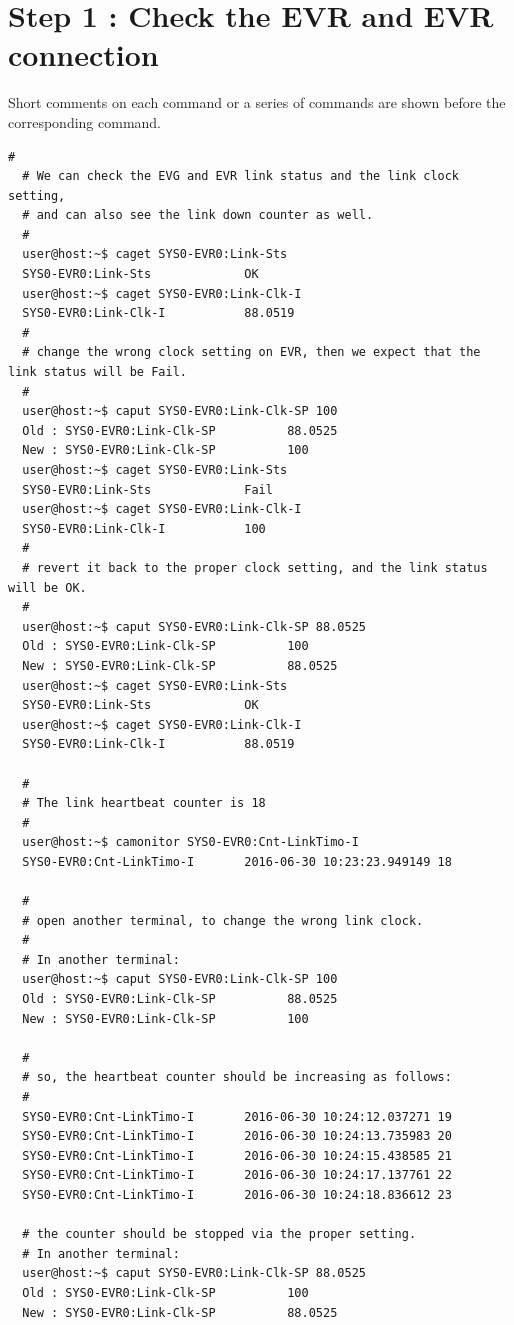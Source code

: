 \documentclass[11pt
  , a4paper
  , article
  , oneside
  , showtrims
]{memoir}
\begin{document}
\section{Step 1 : Check the EVR and EVR connection}
Short comments on each command or a series of commands are shown before the corresponding command.
\begin{lstlisting}[style=termstyle]
  #
  # We can check the EVG and EVR link status and the link clock setting,
  # and can also see the link down counter as well.
  #
  user@host:~$ caget SYS0-EVR0:Link-Sts
  SYS0-EVR0:Link-Sts             OK
  user@host:~$ caget SYS0-EVR0:Link-Clk-I
  SYS0-EVR0:Link-Clk-I           88.0519
  #
  # change the wrong clock setting on EVR, then we expect that the link status will be Fail.  
  #
  user@host:~$ caput SYS0-EVR0:Link-Clk-SP 100
  Old : SYS0-EVR0:Link-Clk-SP          88.0525
  New : SYS0-EVR0:Link-Clk-SP          100
  user@host:~$ caget SYS0-EVR0:Link-Sts
  SYS0-EVR0:Link-Sts             Fail
  user@host:~$ caget SYS0-EVR0:Link-Clk-I
  SYS0-EVR0:Link-Clk-I           100
  #
  # revert it back to the proper clock setting, and the link status will be OK.
  #
  user@host:~$ caput SYS0-EVR0:Link-Clk-SP 88.0525
  Old : SYS0-EVR0:Link-Clk-SP          100
  New : SYS0-EVR0:Link-Clk-SP          88.0525
  user@host:~$ caget SYS0-EVR0:Link-Sts
  SYS0-EVR0:Link-Sts             OK
  user@host:~$ caget SYS0-EVR0:Link-Clk-I
  SYS0-EVR0:Link-Clk-I           88.0519

  #
  # The link heartbeat counter is 18
  #
  user@host:~$ camonitor SYS0-EVR0:Cnt-LinkTimo-I
  SYS0-EVR0:Cnt-LinkTimo-I       2016-06-30 10:23:23.949149 18

  #
  # open another terminal, to change the wrong link clock. 
  #
  # In another terminal:
  user@host:~$ caput SYS0-EVR0:Link-Clk-SP 100
  Old : SYS0-EVR0:Link-Clk-SP          88.0525
  New : SYS0-EVR0:Link-Clk-SP          100

  #
  # so, the heartbeat counter should be increasing as follows: 
  #
  SYS0-EVR0:Cnt-LinkTimo-I       2016-06-30 10:24:12.037271 19
  SYS0-EVR0:Cnt-LinkTimo-I       2016-06-30 10:24:13.735983 20
  SYS0-EVR0:Cnt-LinkTimo-I       2016-06-30 10:24:15.438585 21
  SYS0-EVR0:Cnt-LinkTimo-I       2016-06-30 10:24:17.137761 22
  SYS0-EVR0:Cnt-LinkTimo-I       2016-06-30 10:24:18.836612 23

  # the counter should be stopped via the proper setting.
  # In another terminal:
  user@host:~$ caput SYS0-EVR0:Link-Clk-SP 88.0525
  Old : SYS0-EVR0:Link-Clk-SP          100
  New : SYS0-EVR0:Link-Clk-SP          88.0525
\end{lstlisting}
\end{document}
